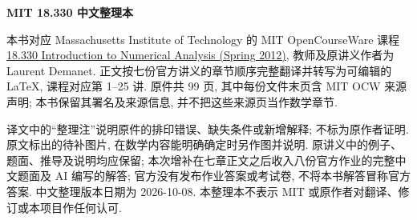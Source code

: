 \frontmatter
\begin{center}
{\color{structurecolor}\bfseries\fontsize{18}{25}\selectfont\BookTitle\par}
{\bfseries MIT 18.330 中文整理本\par}
\BookAuthor\par
\BookDate\par
\end{center}
\originalpreface
本书对应 Massachusetts Institute of Technology 的 MIT OpenCourseWare 课程 \href{https://ocw.mit.edu/courses/18-330-introduction-to-numerical-analysis-spring-2012/}{18.330 Introduction to Numerical Analysis (Spring 2012)}, 教师及原讲义作者为 Laurent Demanet. 正文按七份官方讲义的章节顺序完整翻译并转写为可编辑的 LaTeX, 课程对应第 1--25 讲. 原件共 99 页, 其中每份文件末页含 MIT OCW 来源声明; 本书保留其署名及来源信息, 并不把这些来源页当作数学章节.

译文中的“整理注”说明原件的排印错误、缺失条件或新增解释; 不标为原作者证明. 原文标出的待补图片, 在数学内容能明确确定时另作图并说明. 原讲义中的例子、题面、推导及说明均应保留; 本次增补在七章正文之后收入八份官方作业的完整中文题面及 AI 编写的解答; 官方没有发布作业答案或考试卷, 不将本书解答冒称官方答案. 中文整理版本日期为 2026-10-08. 本整理本不表示 MIT 或原作者对翻译、修订或本项目作任何认可.

